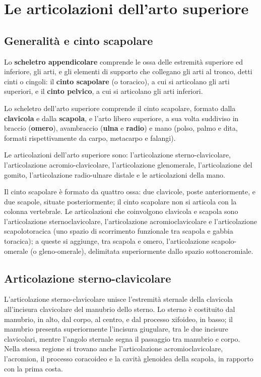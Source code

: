 \chapter{Le articolazioni dell'arto superiore}

\section{Generalità e cinto scapolare}

Lo \textbf{scheletro appendicolare} comprende le ossa delle estremità
superiore ed inferiore, gli arti, e gli elementi di supporto che collegano
gli arti al tronco, detti cinti o cingoli: il \textbf{cinto scapolare} (o
toracico), a cui si articolano gli arti superiori, e il \textbf{cinto
pelvico}, a cui si articolano gli arti inferiori.

Lo scheletro dell'arto superiore comprende il cinto scapolare, formato
dalla \textbf{clavicola} e dalla \textbf{scapola}, e l'arto libero
superiore, a sua volta suddiviso in braccio (\textbf{omero}), avambraccio
(\textbf{ulna} e \textbf{radio}) e mano (polso, palmo e dita, formati
rispettivamente da carpo, metacarpo e falangi).

Le articolazioni dell'arto superiore sono: l'articolazione
sterno-clavicolare, l'articolazione acromio-clavicolare, l'articolazione
glenomerale, l'articolazione del gomito, l'articolazione radio-ulnare
distale e le articolazioni della mano.

Il cinto scapolare è formato da quattro ossa: due clavicole, poste
anteriormente, e due scapole, situate posteriormente; il cinto scapolare
non si articola con la colonna vertebrale. Le articolazioni che
coinvolgono clavicola e scapola sono l'articolazione sternoclavicolare,
l'articolazione acromioclavicolare e l'articolazione scapolotoracica (uno
spazio di scorrimento funzionale tra scapola e gabbia toracica); a queste
si aggiunge, tra scapola e omero, l'articolazione scapolo-omerale (o
gleno-omerale), delimitata superiormente dallo spazio sottoacromiale.

\section{Articolazione sterno-clavicolare}

L'articolazione sterno-clavicolare unisce l'estremità sternale della
clavicola all'incisura clavicolare del manubrio dello sterno. Lo sterno è
costituito dal manubrio, in alto, dal corpo, al centro, e dal processo
xifoideo, in basso; il manubrio presenta superiormente l'incisura
giugulare, tra le due incisure clavicolari, mentre l'angolo sternale segna
il passaggio tra manubrio e corpo. Nella stessa regione si trovano anche
l'articolazione acromioclavicolare, l'acromion, il processo coracoideo e
la cavità glenoidea della scapola, in rapporto con la prima costa.

